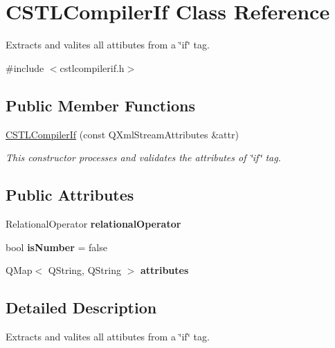 \hypertarget{class_c_s_t_l_compiler_if}{}\section{C\+S\+T\+L\+Compiler\+If Class Reference}
\label{class_c_s_t_l_compiler_if}


Extracts and valites all attibutes from a \char`\"{}if\char`\"{} tag.  




{\ttfamily \#include $<$cstlcompilerif.\+h$>$}

\subsection*{Public Member Functions}
\begin{DoxyCompactItemize}
\item 
\hyperlink{class_c_s_t_l_compiler_if_a6d9ff3428d392123f5139d8ca65e5322}{C\+S\+T\+L\+Compiler\+If} (const Q\+Xml\+Stream\+Attributes \&attr)
\begin{DoxyCompactList}\small\item\em This constructor processes and validates the attributes of \char`\"{}if\char`\"{} tag. \end{DoxyCompactList}\end{DoxyCompactItemize}
\subsection*{Public Attributes}
\begin{DoxyCompactItemize}
\item 
\mbox{\label{class_c_s_t_l_compiler_if_a62b146cf929d1281be7a4d280bff04df}} 
Relational\+Operator {\bfseries relational\+Operator}
\item 
\mbox{\label{class_c_s_t_l_compiler_if_a598f5f0e824ffa6a6b817a362e108363}} 
bool {\bfseries is\+Number} = false
\item 
\mbox{\label{class_c_s_t_l_compiler_if_a6bf7af6ef1a5c9c5f0654b6873ffe6d0}} 
Q\+Map$<$ Q\+String, Q\+String $>$ {\bfseries attributes}
\end{DoxyCompactItemize}


\subsection{Detailed Description}
Extracts and valites all attibutes from a \char`\"{}if\char`\"{} tag. 

